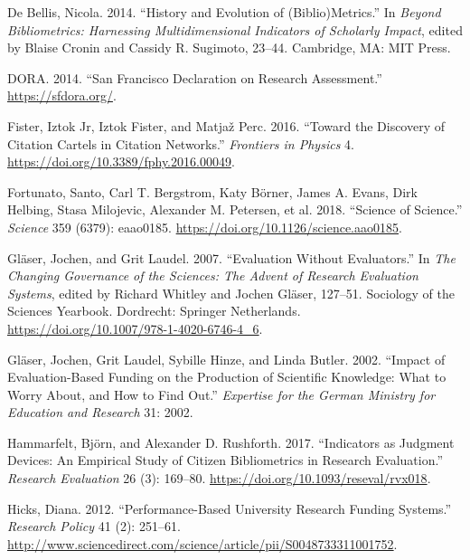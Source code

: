 \documentclass[]{elsarticle} %
\begin{document}
\leavevmode\hypertarget{ref-debellisHistoryEvolutionBiblio2014}{}%
De Bellis, Nicola. 2014. ``History and Evolution of (Biblio)Metrics.''
In \emph{Beyond Bibliometrics: Harnessing Multidimensional Indicators of
Scholarly Impact}, edited by Blaise Cronin and Cassidy R. Sugimoto,
23--44. Cambridge, MA: MIT Press.

\leavevmode\hypertarget{ref-doraSanFranciscoDeclaration2014}{}%
DORA. 2014. ``San Francisco Declaration on Research Assessment.''
\url{https://sfdora.org/}.

\leavevmode\hypertarget{ref-fisterDiscoveryCitationCartels2016}{}%
Fister, Iztok Jr, Iztok Fister, and Matjaž Perc. 2016. ``Toward the
Discovery of Citation Cartels in Citation Networks.'' \emph{Frontiers in
Physics} 4. \url{https://doi.org/10.3389/fphy.2016.00049}.

\leavevmode\hypertarget{ref-fortunatoScienceScience2018}{}%
Fortunato, Santo, Carl T. Bergstrom, Katy Börner, James A. Evans, Dirk
Helbing, Stasa Milojevic, Alexander M. Petersen, et al. 2018. ``Science
of Science.'' \emph{Science} 359 (6379): eaao0185.
\url{https://doi.org/10.1126/science.aao0185}.

\leavevmode\hypertarget{ref-glaserEvaluationEvaluators2007}{}%
Gläser, Jochen, and Grit Laudel. 2007. ``Evaluation Without
Evaluators.'' In \emph{The Changing Governance of the Sciences: The
Advent of Research Evaluation Systems}, edited by Richard Whitley and
Jochen Gläser, 127--51. Sociology of the Sciences Yearbook. Dordrecht:
Springer Netherlands. \url{https://doi.org/10.1007/978-1-4020-6746-4_6}.

\leavevmode\hypertarget{ref-glaserImpactEvaluationbasedFunding2002}{}%
Gläser, Jochen, Grit Laudel, Sybille Hinze, and Linda Butler. 2002.
``Impact of Evaluation-Based Funding on the Production of Scientific
Knowledge: What to Worry About, and How to Find Out.'' \emph{Expertise
for the German Ministry for Education and Research} 31: 2002.

\leavevmode\hypertarget{ref-hammarfeltIndicatorsJudgmentDevices2017}{}%
Hammarfelt, Björn, and Alexander D. Rushforth. 2017. ``Indicators as
Judgment Devices: An Empirical Study of Citizen Bibliometrics in
Research Evaluation.'' \emph{Research Evaluation} 26 (3): 169--80.
\url{https://doi.org/10.1093/reseval/rvx018}.

\leavevmode\hypertarget{ref-hicksPerformancebasedUniversityResearch2012}{}%
Hicks, Diana. 2012. ``Performance-Based University Research Funding
Systems.'' \emph{Research Policy} 41 (2): 251--61.
\url{http://www.sciencedirect.com/science/article/pii/S0048733311001752}.
\end{document}
